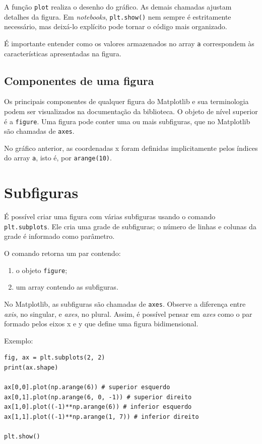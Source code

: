 \documentclass[11pt,a4paper]{article}
\begin{document}
A função \texttt{plot} realiza o desenho do gráfico. As demais chamadas ajustam detalhes da figura. Em \textit{notebooks}, \texttt{plt.show()} nem sempre é estritamente necessário, mas deixá-lo explícito pode tornar o código mais organizado.

É importante entender como os valores armazenados no array \texttt{a} correspondem às características apresentadas na figura.

\subsection{Componentes de uma figura}

Os principais componentes de qualquer figura do Matplotlib e sua terminologia podem ser visualizados na documentação da biblioteca. O objeto de nível superior é a \texttt{figure}. Uma figura pode conter uma ou mais subfiguras, que no Matplotlib são chamadas de \texttt{axes}.

No gráfico anterior, as coordenadas x foram definidas implicitamente pelos índices do array \texttt{a}, isto é, por \texttt{arange(10)}.

\section{Subfiguras}

É possível criar uma figura com várias subfiguras usando o comando \texttt{plt.subplots}. Ele cria uma grade de subfiguras; o número de linhas e colunas da grade é informado como parâmetro.

O comando retorna um par contendo:
\begin{enumerate}
    \item o objeto \texttt{figure};
    \item um array contendo as subfiguras.
\end{enumerate}

No Matplotlib, as subfiguras são chamadas de \texttt{axes}. Observe a diferença entre \textit{axis}, no singular, e \textit{axes}, no plural. Assim, é possível pensar em \textit{axes} como o par formado pelos eixos x e y que define uma figura bidimensional.

Exemplo:

\begin{lstlisting}
fig, ax = plt.subplots(2, 2)
print(ax.shape)

ax[0,0].plot(np.arange(6)) # superior esquerdo
ax[0,1].plot(np.arange(6, 0, -1)) # superior direito
ax[1,0].plot((-1)**np.arange(6)) # inferior esquerdo
ax[1,1].plot((-1)**np.arange(1, 7)) # inferior direito

plt.show()
\end{lstlisting}
\end{document}
